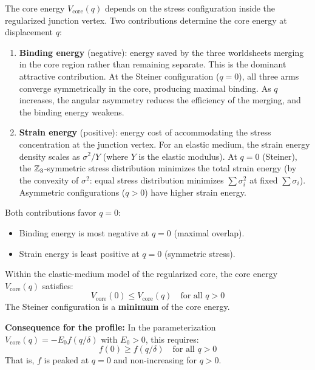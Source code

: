 The core energy $V_{\mathrm{core}}(q)$ depends on the stress
configuration inside the regularized junction vertex. Two contributions
determine the core energy at displacement $q$:

\begin{enumerate}
    \item \textbf{Binding energy} (negative): energy saved by the
          three worldsheets merging in the core region rather than
          remaining separate. This is the dominant attractive contribution.
          At the Steiner configuration ($q = 0$), all three arms converge
          symmetrically in the core, producing maximal binding.
          As $q$ increases, the angular asymmetry reduces the efficiency
          of the merging, and the binding energy weakens.

    \item \textbf{Strain energy} (positive): energy cost of
          accommodating the stress concentration at the junction vertex.
          For an elastic medium, the strain energy density scales as
          $\sigma^2/Y$ (where $Y$ is the elastic modulus). At $q = 0$
          (Steiner), the $\mathbb{Z}_3$-symmetric stress distribution
          minimizes the total strain energy (by the convexity of
          $\sigma^2$: equal stress distribution minimizes $\sum \sigma_i^2$
          at fixed $\sum \sigma_i$). Asymmetric configurations
          ($q > 0$) have higher strain energy.
\end{enumerate}

Both contributions favor $q = 0$:
\begin{itemize}
    \item Binding energy is most negative at $q = 0$ (maximal overlap).
    \item Strain energy is least positive at $q = 0$ (symmetric stress).
\end{itemize}

\begin{derivationbox}[title=Physical Sign Determination]
Within the elastic-medium model of the regularized core, the core
energy $V_{\mathrm{core}}(q)$ satisfies:
\begin{equation}
    V_{\mathrm{core}}(0) \leq V_{\mathrm{core}}(q)
    \quad \text{for all } q > 0
    \label{eq:N7_Vcore_min_at_zero}
\end{equation}
The Steiner configuration is a \textbf{minimum} of the core energy.
\tagDcI

\textbf{Consequence for the profile:} In the parameterization
$V_{\mathrm{core}}(q) = -E_0 f(q/\delta)$ with $E_0 > 0$, this
requires:
\begin{equation}
    f(0) \geq f(q/\delta) \quad \text{for all } q > 0
    \label{eq:N7_f_peaked_at_zero}
\end{equation}
That is, $f$ is peaked at $q = 0$ and non-increasing for $q > 0$.
\end{derivationbox}

